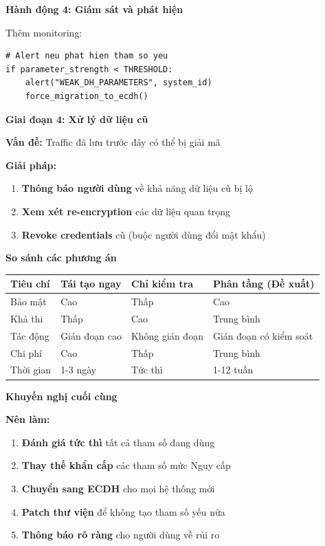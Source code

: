 \textbf{Hành động 4: Giám sát và phát hiện}

Thêm monitoring:

\begin{verbatim}
# Alert neu phat hien tham so yeu
if parameter_strength < THRESHOLD:
    alert("WEAK_DH_PARAMETERS", system_id)
    force_migration_to_ecdh()
\end{verbatim}

\textbf{Giai đoạn 4: Xử lý dữ liệu cũ}

\textbf{Vấn đề:} Traffic đã lưu trước đây có thể bị giải mã

\textbf{Giải pháp:}
\begin{enumerate}
    \item \textbf{Thông báo người dùng} về khả năng dữ liệu cũ bị lộ
    \item \textbf{Xem xét re-encryption} các dữ liệu quan trọng
    \item \textbf{Revoke credentials} cũ (buộc người dùng đổi mật khẩu)
\end{enumerate}

\textbf{So sánh các phương án}

\begin{center}
\begin{tabular}{|p{2.5cm}|p{3.5cm}|p{3.5cm}|p{3.5cm}|}
\hline
\textbf{Tiêu chí} & \textbf{Tái tạo ngay} & \textbf{Chỉ kiểm tra} & \textbf{Phân tầng (Đề xuất)} \\
\hline
Bảo mật & Cao & Thấp & Cao \\
Khả thi & Thấp & Cao & Trung bình \\
Tác động & Gián đoạn cao & Không gián đoạn & Gián đoạn có kiểm soát \\
Chi phí & Cao & Thấp & Trung bình \\
Thời gian & 1-3 ngày & Tức thì & 1-12 tuần \\
\hline
\end{tabular}
\end{center}

\textbf{Khuyến nghị cuối cùng}

\textbf{Nên làm:}
\begin{enumerate}
    \item \textbf{Đánh giá tức thì} tất cả tham số đang dùng
    \item \textbf{Thay thế khẩn cấp} các tham số mức Nguy cấp
    \item \textbf{Chuyển sang ECDH} cho mọi hệ thống mới
    \item \textbf{Patch thư viện} để không tạo tham số yếu nữa
    \item \textbf{Thông báo rõ ràng} cho người dùng về rủi ro
\end{enumerate}

